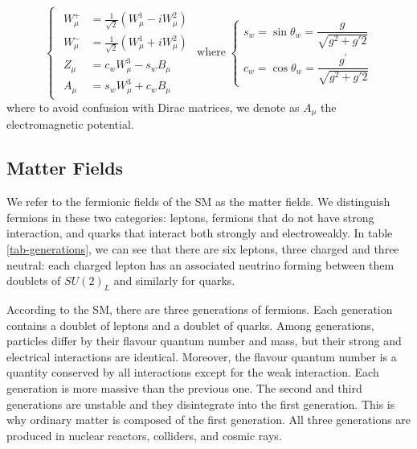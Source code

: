 \begin{equation}
\begin{cases}
	\begin{aligned}
		W_{\mu}^{+} &=\frac{1}{\sqrt{2}}\left(W_{\mu}^{1}-i W_{\mu}^{2}\right) \\
		W_{\mu}^{-} &=\frac{1}{\sqrt{2}}\left(W_{\mu}^{1}+i W_{\mu}^{2}\right) \\
		Z_{\mu} &=c_{w} W_{\mu}^{3}-s_{w} B_{\mu} \\
		A_{\mu} &=s_{w} W_{\mu}^{3}+c_{w} B_{\mu}
	\end{aligned}
\end{cases}
\text{where}
\;
\begin{cases}
	s_{w}=\sin \theta_{w}=\dfrac{g}{\sqrt{g^{2}+g{\prime2}}}\\
	c_{w}=\cos \theta_{w}=\dfrac{g^\prime}{\sqrt{g^{2}+g{\prime2}}}
\end{cases}
\end{equation}
where to avoid confusion with Dirac matrices, we denote as $A_\mu$ the electromagnetic potential.
\subsection{Matter Fields}
We refer to the fermionic fields of the SM as the matter fields. We distinguish fermions in these two categories: leptons, fermions that do not have strong interaction, and quarks that interact both strongly and electroweakly. In table \ref{tab-generations}, we can see that there are six leptons, three charged and three neutral: each charged lepton has an associated neutrino forming between them doublets of $SU(2)_L$ and similarly for quarks. 

According to the SM, there are three generations of fermions. Each generation contains a doublet of leptons and a doublet of quarks. Among generations, particles differ by their flavour quantum number and mass, but their strong and electrical interactions are identical. Moreover, the flavour quantum number is a quantity conserved by all interactions except for the weak interaction.  Each generation is more massive than the previous one. The second and third generations are unstable and they disintegrate into the first generation. This is why ordinary matter is composed of the first generation. All three generations are produced in nuclear reactors, colliders, and cosmic rays. 

